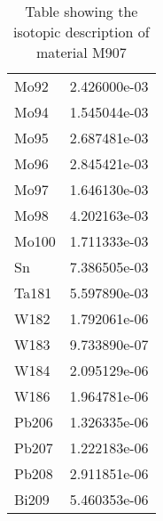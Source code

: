 \begin{centering}
\begin{table}[ht!]
\begin{tabular}{l | c}
Mo92 & 2.426000e-03\\
Mo94 & 1.545044e-03\\
Mo95 & 2.687481e-03\\
Mo96 & 2.845421e-03\\
Mo97 & 1.646130e-03\\
Mo98 & 4.202163e-03\\
Mo100 & 1.711333e-03\\
Sn & 7.386505e-03\\
Ta181 & 5.597890e-03\\
W182 & 1.792061e-06\\
W183 & 9.733890e-07\\
W184 & 2.095129e-06\\
W186 & 1.964781e-06\\
Pb206 & 1.326335e-06\\
Pb207 & 1.222183e-06\\
Pb208 & 2.911851e-06\\
Bi209 & 5.460353e-06
\end{tabular}
\caption{Table showing the isotopic description of material M907}
\label{table:material_M907}
\end{table}\clearpage


\end{centering}
